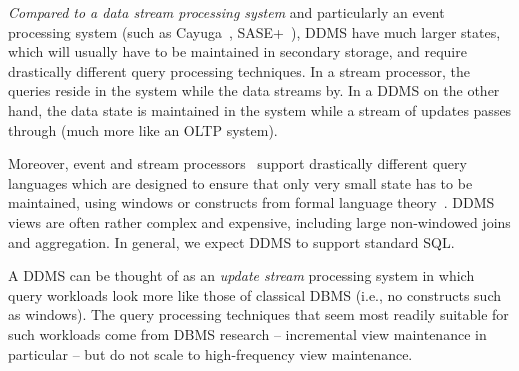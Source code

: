 {{\em Compared to a data stream processing system}\/
and particularly an event processing system (such as
Cayuga~\cite{demers-sigmod:07}, SASE+~\cite{agrawal-sigmod:08}),
%
DDMS have much larger states, which will usually have to be maintained in
secondary storage, and require drastically different query processing
techniques. In a stream processor, the queries reside in the system while the
data streams by. In a DDMS on the other hand, the data state is maintained in
the system while a stream of updates passes through (much more like an OLTP
system).

%
Moreover, event and stream processors~\cite{abadi-vldbj:03, motwani-cidr:03,
chandrasekaran-cidr:03} support drastically different query languages which are
designed to ensure that only very small state has to be maintained, using
windows or constructs from formal language theory~\cite{white-pods:07}. DDMS
views are often rather complex and expensive, including large non-windowed joins
and aggregation. In general, we expect DDMS to support standard SQL.


A DDMS can be thought of as an {\em update stream}\/ processing system in which
query workloads look more like those of classical DBMS (i.e., no constructs such
as windows). The query processing techniques that seem most readily suitable for
such workloads come from DBMS research -- incremental view maintenance in
particular -- but do not scale to high-frequency view maintenance.
}


\medskip

